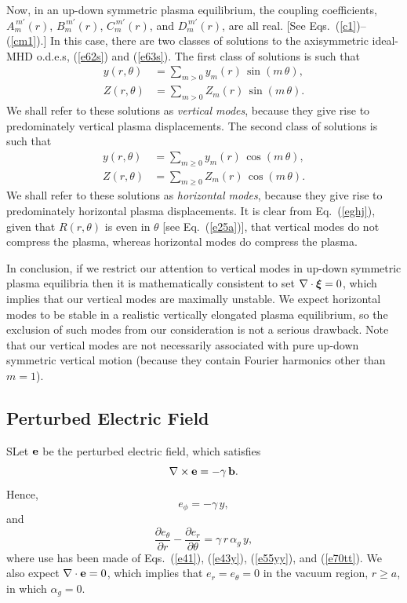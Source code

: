 \documentclass[12pt,prb,aps]{revtex4-1}
\newcommand {\bxi}{\mbox{\boldmath$\xi$}}
\begin{document}
Now, in an up-down symmetric plasma equilibrium, the coupling coefficients, $A_m^{\,m'}(r)$, $B_m^{\,m'}(r)$, $C_{m}^{\,m'}(r)$, and $D_m^{\,m'}(r)$,
are all real. [See Eqs.~(\ref{c1})--(\ref{cm1}).] 
In this case, there are two classes of solutions to the axisymmetric ideal-MHD o.d.e.s, (\ref{e62s}) and (\ref{e63s}). 
The first class of solutions is such that
\begin{align}
y(r,\theta)&= \sum_{m>0} y_m(r)\,\sin(m\,\theta),\\[0.5ex]
Z(r,\theta)&= \sum_{m>0} Z_m(r)\,\sin(m\,\theta).
\end{align}
We shall refer to these solutions as {\em vertical modes}, because they give rise to predominately vertical plasma displacements. 
The second class of solutions is such that
\begin{align}
y(r,\theta)&= \sum_{m\geq 0} y_m(r)\,\cos(m\,\theta),\\[0.5ex]
Z(r,\theta)&= \sum_{m\geq 0} Z_m(r)\,\cos(m\,\theta).
\end{align}
We shall refer to these solutions as {\em horizontal modes}, because they give rise to predominately horizontal plasma displacements. 
It is clear from Eq.~(\ref{eghj}), given that $R(r,\theta)$ is even in $\theta$ [see Eq.~(\ref{e25a})], that vertical modes do not compress the
plasma, whereas horizontal modes do compress the plasma.\cite{reb}

In conclusion, if we restrict our attention to vertical modes in up-down symmetric plasma equilibria then it is mathematically consistent  to set $\nabla\cdot\bxi=0$,
which implies that our vertical modes are maximally unstable. We expect horizontal modes to be stable in a realistic vertically elongated
plasma equilibrium,\cite{reb} so the exclusion of such modes from our consideration is not a serious drawback. Note that our vertical
modes are not necessarily associated with pure up-down symmetric vertical motion (because they contain Fourier harmonics other than $m=1$).\cite{ros} 

\subsection{Perturbed Electric Field}
SLet ${\bf e}$ be the perturbed electric field, which satisfies 
\begin{equation}
\nabla\times {\bf e} =-\gamma\,{\bf b}.
\end{equation}
Hence,
\begin{equation}\label{ephi}
e_\phi = -\gamma\,y,
\end{equation}
and 
\begin{equation}\label{e81op}
\frac{\partial e_\theta}{\partial r} - \frac{\partial e_r}{\partial\theta} = \gamma\,r\,\alpha_g\,y,
\end{equation}
where use has been made of Eqs.~(\ref{e41}), (\ref{e43y}),  (\ref{e55yy}), and (\ref{e70tt}). 
We also expect $\nabla\cdot{\bf e} =0$, which implies that 
$e_r=e_\theta=0$ in the vacuum region, $r\geq a$, in which $\alpha_g=0$. 
\end{document}
